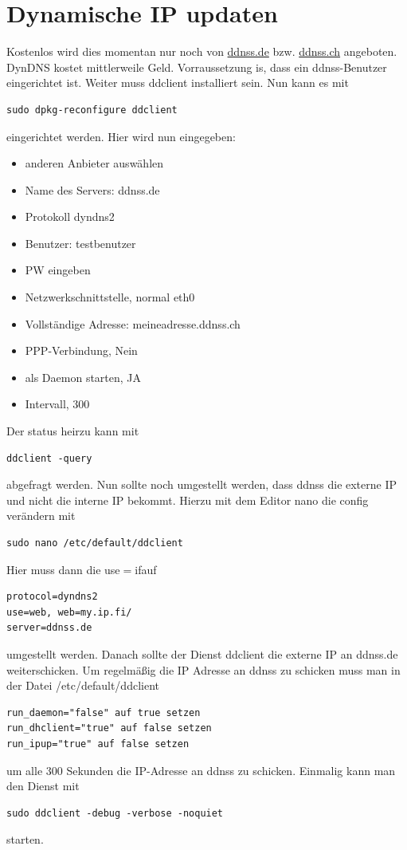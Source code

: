 \documentclass[11pt,fleqn]{book} %
\numberwithin{equation}{section} %
\numberwithin{figure}{section} %
\numberwithin{table}{section} %
\begin{document}
\chapter{Dynamische IP updaten}
Kostenlos wird dies momentan nur noch von \url{ddnss.de} bzw. \url{ddnss.ch} angeboten. DynDNS kostet mittlerweile Geld. Vorraussetzung is, dass ein ddnss-Benutzer eingerichtet ist. Weiter muss ddclient installiert sein. Nun kann es mit
\begin{lstlisting}
sudo dpkg-reconfigure ddclient
\end{lstlisting}
eingerichtet werden. Hier wird nun eingegeben:
\begin{itemize}
 \item anderen Anbieter auswählen
 \item Name des Servers: ddnss.de
 \item Protokoll dyndns2
 \item  Benutzer: testbenutzer
 \item PW eingeben
 \item Netzwerkschnittstelle, normal eth0
 \item Vollständige Adresse: meineadresse.ddnss.ch
 \item  PPP-Verbindung, Nein
 \item  als Daemon starten, JA
 \item Intervall, 300
\end{itemize}
Der status heirzu kann mit
\begin{lstlisting}
ddclient -query
\end{lstlisting}
abgefragt werden. Nun sollte noch umgestellt werden, dass ddnss die externe IP und nicht die interne IP bekommt. Hierzu mit dem Editor nano die config verändern mit
\begin{lstlisting}
sudo nano /etc/default/ddclient
\end{lstlisting}
Hier muss dann die \glqq use$=$if\grqq auf
\begin{lstlisting}
protocol=dyndns2
use=web, web=my.ip.fi/
server=ddnss.de
\end{lstlisting}
umgestellt werden. Danach sollte der Dienst ddclient die externe IP an ddnss.de weiterschicken. Um regelmäßig die IP Adresse an ddnss zu schicken muss man in der Datei \glqq /etc/default/ddclient\grqq
\begin{lstlisting}
run_daemon="false" auf true setzen 
run_dhclient="true" auf false setzen
run_ipup="true" auf false setzen
\end{lstlisting}
um alle 300 Sekunden die IP-Adresse an ddnss zu schicken.
Einmalig kann man den Dienst mit
\begin{lstlisting}
sudo ddclient -debug -verbose -noquiet
\end{lstlisting}
starten.
\end{document}

